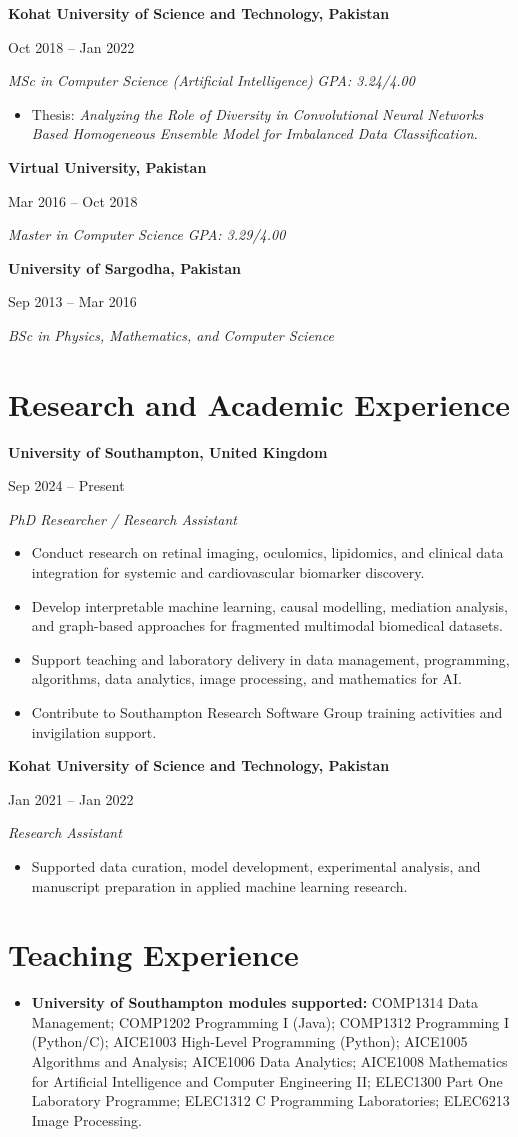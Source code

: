 \documentclass[11pt,a4paper]{article}
\newcommand{\entry}[4]{
  \textbf{#1}\par
  {\small\color{cvmuted}#2}\par
  \emph{#3}%
  \if\relax\detokenize{#4}\relax\else\hfill{\small\color{cvmuted}\emph{#4}}\fi\par
  \vspace{0.08em}
}
\begin{document}
\entry{Kohat University of Science and Technology, Pakistan}{Oct 2018 -- Jan 2022}{MSc in Computer Science (Artificial Intelligence)}{GPA: 3.24/4.00}
\begin{itemize}
  \item Thesis: \emph{Analyzing the Role of Diversity in Convolutional Neural Networks Based Homogeneous Ensemble Model for Imbalanced Data Classification.}
\end{itemize}

\entry{Virtual University, Pakistan}{Mar 2016 -- Oct 2018}{Master in Computer Science}{GPA: 3.29/4.00}
\entry{University of Sargodha, Pakistan}{Sep 2013 -- Mar 2016}{BSc in Physics, Mathematics, and Computer Science}{}

\section*{Research and Academic Experience}
\entry{University of Southampton, United Kingdom}{Sep 2024 -- Present}{PhD Researcher / Research Assistant}{}
\begin{itemize}
  \item Conduct research on retinal imaging, oculomics, lipidomics, and clinical data integration for systemic and cardiovascular biomarker discovery.
  \item Develop interpretable machine learning, causal modelling, mediation analysis, and graph-based approaches for fragmented multimodal biomedical datasets.
  \item Support teaching and laboratory delivery in data management, programming, algorithms, data analytics, image processing, and mathematics for AI.
  \item Contribute to Southampton Research Software Group training activities and invigilation support.
\end{itemize}

\entry{Kohat University of Science and Technology, Pakistan}{Jan 2021 -- Jan 2022}{Research Assistant}{}
\begin{itemize}
  \item Supported data curation, model development, experimental analysis, and manuscript preparation in applied machine learning research.
\end{itemize}

\section*{Teaching Experience}
\begin{itemize}
  \item \textbf{University of Southampton modules supported:} COMP1314 Data Management; COMP1202 Programming I (Java); COMP1312 Programming I (Python/C); AICE1003 High-Level Programming (Python); AICE1005 Algorithms and Analysis; AICE1006 Data Analytics; AICE1008 Mathematics for Artificial Intelligence and Computer Engineering II; ELEC1300 Part One Laboratory Programme; ELEC1312 C Programming Laboratories; ELEC6213 Image Processing.
\end{itemize}
\end{document}
